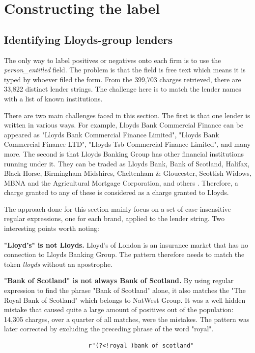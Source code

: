 \documentclass[ %
                    author={Natchalin Iwsakul \\ Inkaphol Siriwongwattana \\ Tanaphan Kummaraphat \\ Patorn Srisupap},
                supervisor={Fernando Moreno-Pino},
                    degree={MSc},
                     title={Propensity Modelling for SME Commercial Lending Using Open Public Data},
                  subtitle={Companies House filings and GDELT media coverage as predictors of first-time borrowing},
                      type={},
                      year={2026}]{dissertation}
\begin{document}
\section{Constructing the label}               \label{sec:label}
  \subsection{Identifying Lloyds-group lenders}
  The only way to label positives or negatives onto each firm is to use the \textit{person\_entitled} field. The problem is that the field is free text which means it is typed by whoever filed the form. From the 399,703 charges retrieved, there are 33,822 distinct lender strings. The challenge here is to match the lender names with a list of known institutions.

  There are two main challenges faced in this section. The first is that one lender is written in various ways. For example, Lloyds Bank Commercial Finance can be appeared as "Lloyds Bank Commercial Finance Limited", "Lloyds Bank Commercial Finance LTD", "Lloyds Tsb Commercial Finance Limited", and many more. The second is that Lloyds Banking Group has other financial institutions running under it. They can be traded as Lloyds Bank, Bank of Scotland, Halifax, Black Horse, Birmingham Midshires, Cheltenham \& Gloucester, Scottish Widows, MBNA and the Agricultural Mortgage Corporation, and others \citep{lbg_annual_report}. Therefore, a charge granted to any of these is considered as a charge granted to Lloyds.

  The approach done for this section mainly focus on a set of case-insensitive regular expressions, one for each brand, applied to the lender string. Two interesting points worth noting:

  \textbf{"Lloyd's" is not Lloyds.} Lloyd's of London is an insurance market that has no connection to Lloyds Banking Group. The pattern therefore needs to match the token \textit{lloyds} without an apostrophe.

  \textbf{"Bank of Scotland" is not always Bank of Scotland.} By using regular expression to find the phrase "Bank of Scotland" alone, it also matches the "The Royal Bank of Scotland" which belongs to NatWest Group. It was a well hidden mistake that caused quite a large amount of positives out of the population: 14,305 charges, over a quarter of all matches, were the mistakes. The pattern was later corrected by excluding the preceding phrase of the word "royal".
  
                        \begin{lstlisting}
                        r"(?<!royal )bank of scotland"
                        \end{lstlisting}
\end{document}
